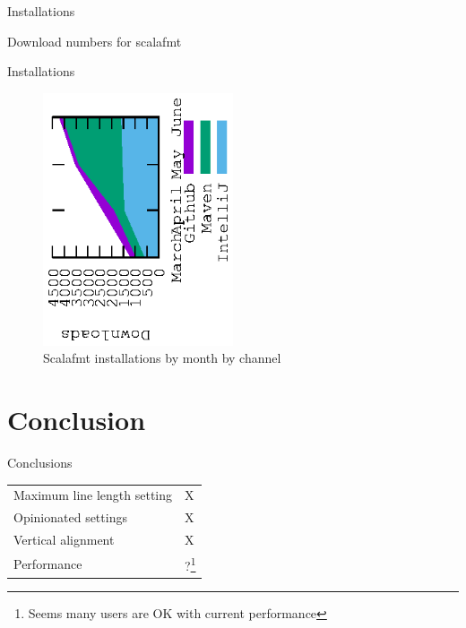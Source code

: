 \documentclass[xcolor=dvipsnames]{beamer}
\theoremstyle{definition}
\begin{document}
\begin{frame}{Installations}
  \begin{table}[]
    \centering
    \caption{Download numbers for scalafmt}
     
  \end{table}
\end{frame}

\begin{frame}{Installations}
  \begin{figure}[H]
    \centering
    \includegraphics[angle=-90,width=0.5\textwidth]{tables/month.eps}
    \caption{Scalafmt installations by month by channel}
  \end{figure}
\end{frame}



\section{Conclusion} %
\label{sec:Conclusion}

\begin{frame}{Conclusions}
  \begin{table}
    \centering
    \begin{tabular}{ll}
      Maximum line length setting & X \\
      Opinionated settings        & X \\
      Vertical alignment          & X \\
      Performance                 & ?\footnote{Seems many users are OK with
                                               current performance}
    \end{tabular}
  \end{table}
\end{frame}
\end{document}
